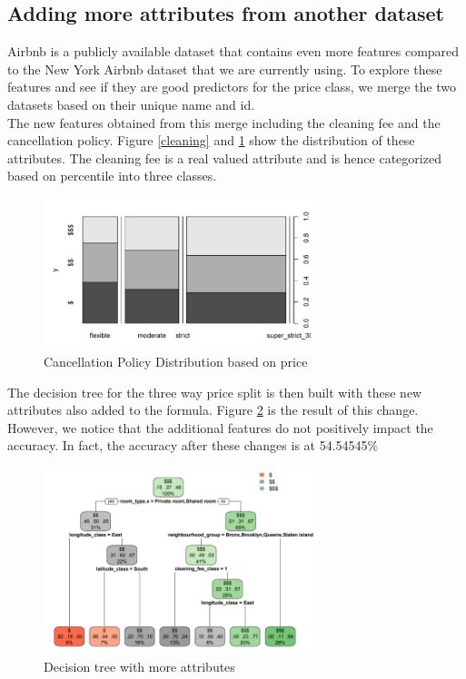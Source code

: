 \documentclass{sig-alternate}
\begin{document}
	\subsection{Adding more attributes from another dataset}
	Airbnb is a publicly available dataset that contains even more features compared to the New York Airbnb dataset that we are currently using. To explore these features and see if they are good predictors for the price class, we merge the two datasets based on their unique name and id. \\
	The new features obtained from this merge including the cleaning fee and the cancellation policy. Figure \ref{cleaning} and \ref{cancellation} show the distribution of these attributes. 
	The cleaning fee is a real valued attribute and is hence categorized based on percentile into three classes.\\
\begin{figure}[ht]
	\includegraphics[width=8cm]{cancellation.PNG}
	\caption{Cancellation Policy Distribution based on price}
	\label{cancellation}
	\centering
\end{figure}
	The decision tree for the three way price split is then built with these new attributes also added to the formula. Figure \ref{decision5} is the result of this change.\\
	However, we notice that the additional features do not positively impact the accuracy. In fact, the accuracy after these changes is at 54.54545\%
	\begin{figure}[ht]
		\includegraphics[width=8cm]{decision5.PNG}
		\caption{Decision tree with more attributes}
		\label{decision5}
		\centering
	\end{figure}
\end{document}
